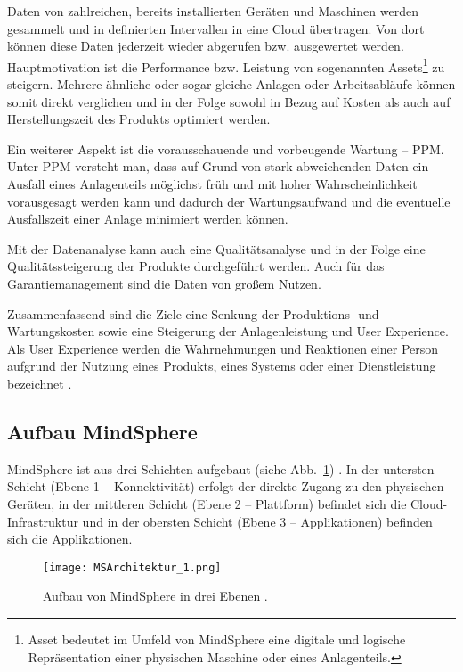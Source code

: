 Daten von zahlreichen, bereits installierten Geräten und Maschinen werden gesammelt und in definierten Intervallen in eine Cloud übertragen. Von dort können diese Daten jederzeit wieder abgerufen bzw. ausgewertet werden. Hauptmotivation ist die Performance bzw. Leistung von sogenannten Assets\footnote{Asset bedeutet im Umfeld von MindSphere eine digitale und logische Repräsentation einer physischen Maschine oder eines Anlagenteils.} zu steigern. Mehrere ähnliche oder sogar gleiche Anlagen oder Arbeitsabläufe können somit direkt verglichen und in der Folge sowohl in Bezug auf Kosten als auch auf Herstellungszeit des Produkts optimiert werden.

Ein weiterer Aspekt ist die vorausschauende und vorbeugende Wartung -- \ac{PPM}.  Unter \ac{PPM} versteht man, dass auf Grund von stark abweichenden Daten ein Ausfall eines Anlagenteils möglichst früh und mit hoher Wahrscheinlichkeit vorausgesagt werden kann und dadurch der Wartungsaufwand und die eventuelle Ausfallszeit einer Anlage minimiert werden können. 

Mit der Datenanalyse kann auch eine Qualitätsanalyse und in der Folge eine Qualitätssteigerung der Produkte durchgeführt werden. Auch für das Garantiemanagement sind die Daten von großem Nutzen. 

Zusammenfassend sind die Ziele eine Senkung der Produktions- und Wartungskosten sowie eine Steigerung der Anlagenleistung und User Experience. Als User Experience werden die Wahrnehmungen und Reaktionen einer Person aufgrund der Nutzung eines Produkts, eines Systems oder einer Dienstleistung bezeichnet \parencite{dis20099241, hartson2012ux}.

\subsection{Aufbau MindSphere }
MindSphere ist aus drei Schichten aufgebaut (siehe Abb.~\ref{fig:MSArchitecture}) \parencite{SiemensMSIntroduction,SiemensWhitepaper}. In der untersten Schicht (Ebene 1 -- Konnektivität) erfolgt der direkte Zugang zu den physischen Geräten, in der mittleren Schicht (Ebene 2 -- Plattform) befindet sich die Cloud-Infrastruktur und in der obersten Schicht (Ebene 3 -- Applikationen) befinden sich die Applikationen.

\begin{figure}[H]
\centering
\texttt{[image: MSArchitektur\_1.png]} 
\caption{Aufbau von MindSphere in drei Ebenen \cite{SiemensMSIntroduction}.}
\label{fig:MSArchitecture}
\end{figure}


